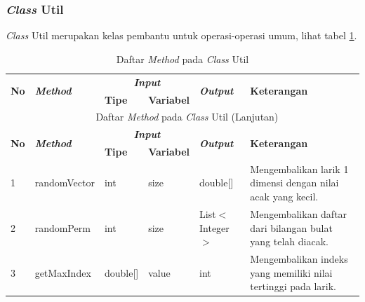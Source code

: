 \subsubsection{\textit{Class} Util}
\noindent \textit{Class} Util merupakan kelas pembantu untuk operasi-operasi umum, lihat tabel \ref{tbl:classUtil}.
\begingroup
\setlength{\LTleft}{-20cm plus -1fill}
\setlength{\LTright}{\LTleft}
\begin{small}
\begin{longtable}{|p{0.4cm}|p{2cm}|p{1.8cm}|p{1.8cm}|p{1.7cm}|p{3.55cm}|}
	\caption{Daftar \textit{Method} pada \textit{Class} Util \label{tbl:classUtil}}\\
	\hline
	\multirow{2}{*}{\textbf{No}} & \multirow{2}{*}{\textit{\textbf{Method}}} & \multicolumn{2}{c|}{\textit{\textbf{Input}}} & \multirow{2}{*}{\textit{\textbf{Output}}} & 
	\multirow{2}{*}{\textbf{Keterangan}}\\
	\cline{3-4}
	& & \textbf{Tipe} & \textbf{Variabel} & & \\
	\endfirsthead
	\multicolumn{6}{c}{\textbf{\tablename~\thetable} Daftar \textit{Method} pada \textit{Class} Util (Lanjutan)} \\
	\hline
	\multirow{2}{*}{\textbf{No}} & \multirow{2}{*}{\textit{\textbf{Method}}} & \multicolumn{2}{c|}{\textit{\textbf{Input}}} & \multirow{2}{*}{\textit{\textbf{Output}}} & 
	\multirow{2}{*}{\textbf{Keterangan}}\\
	\cline{3-4}
	& & \textbf{Tipe} & \textbf{Variabel} & & \\
	\endhead
	\hline
	1 & randomVector & int & size & double[] & Mengembalikan larik 1 dimensi dengan nilai acak yang kecil.\\
	\hline
	2 & randomPerm & int & size & List$<$\newline Integer$>$ & Mengembalikan daftar dari bilangan bulat yang telah diacak.\\
	\hline
	3 & getMaxIndex & double[] & value & int & Mengembalikan indeks yang memiliki nilai tertinggi pada larik.\\
	\hline
\end{longtable}
\end{small}
\endgroup

